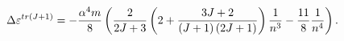 \begin{equation}
\Delta \varepsilon ^{tr(J+1)}=-\frac{\alpha ^{4}m}{8}\left( \frac{2}{2J+3}%
\left( 2+\frac{3J+2}{\left( J+1\right) \left( 2J+1\right) }\right) \frac{1}{%
n^{3}}-\frac{11}{8}\frac{1}{n^{4}}\right) .
\end{equation}

